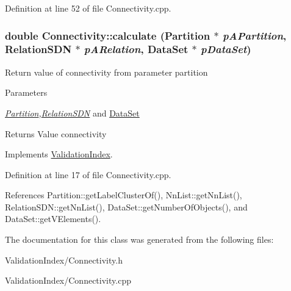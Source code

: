 Definition at line 52 of file Connectivity.cpp.\hypertarget{classConnectivity_ae132296aae336b3e3830431592611a74}{
\subsubsection[{calculate}]{\setlength{\rightskip}{0pt plus 5cm}double Connectivity::calculate ({\bf Partition} $\ast$ {\em pAPartition}, \/  {\bf RelationSDN} $\ast$ {\em pARelation}, \/  {\bf DataSet} $\ast$ {\em pDataSet})}}
\label{classConnectivity_ae132296aae336b3e3830431592611a74}
Return value of connectivity from parameter partition 
\begin{DoxyParams}{Parameters}
\item[{\em \hyperlink{classPartition}{Partition},\hyperlink{classRelationSDN}{RelationSDN}}]and \hyperlink{classDataSet}{DataSet} \end{DoxyParams}
\begin{DoxyReturn}{Returns}
Value connectivity 
\end{DoxyReturn}


Implements \hyperlink{classValidationIndex_a26fe1244f3313bd7f557149f6846fe01}{ValidationIndex}.

Definition at line 17 of file Connectivity.cpp.

References Partition::getLabelClusterOf(), NnList::getNnList(), RelationSDN::getNnList(), DataSet::getNumberOfObjects(), and DataSet::getVElements().

The documentation for this class was generated from the following files:\begin{DoxyCompactItemize}
\item 
ValidationIndex/Connectivity.h\item 
ValidationIndex/Connectivity.cpp\end{DoxyCompactItemize}
